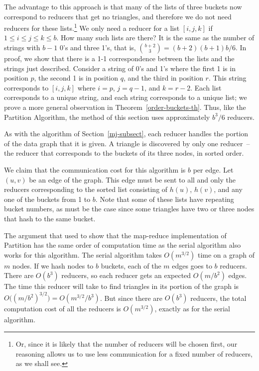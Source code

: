 The advantage to this approach is that many of the lists of three buckets now correspond to reducers that get no triangles, and therefore we do not need reducers for these lists.\footnote{Or, since it is likely that the number of reducers will be chosen first, our reasoning allows us to use less communication for a fixed number of reducers, as we shall see.}
We only need a reducer for a list $[i,j,k]$ if $1\le i \le j \le k \le b$.  How many such lists are there?  It is the same as the number of strings with $b-1$ 0's and three 1's, that is, $\binom{b+2}{3} = (b+2)(b+1)b/6$.  In proof, we show that there is a 1-1 correspondence between the lists and the strings just described.  Consider a string of 0's and 1's where the first 1 is in position $p$, the second 1 is in position $q$, and the third in position $r$.  This string corresponds to $[i,j,k]$ where $i = p$, $j = q-1$, and $k = r-2$.  Each list corresponds to a unique string, and each string corresponds to a unique list; we prove a more general observation in Theorem~\ref{order-buckets-th}.  Thus, like the Partition Algorithm, the method of this section uses approximately $b^3/6$ reducers.

As with the algorithm of Section~\ref{mj-subsect}, each reducer handles the portion of the data graph that it is given.  A triangle is discovered by only one reducer~-- the reducer that corresponds to the buckets of its three nodes, in sorted order.

We claim that the communication cost for this algorithm is $b$ per edge.
Let $(u,v)$ be an edge of the graph.  This edge must be sent to all and only the reducers corresponding to the sorted list consisting of $h(u)$, $h(v)$, and any one of the buckets from 1 to $b$.  Note that some of these lists have repeating bucket numbers, as must be the case since some triangles have two or three nodes that hash to the same bucket.

The argument that \cite{SV11} used to show that the map-reduce implementation of Partition has the same order of computation time as the serial algorithm also works for this algorithm.
The serial algorithm takes $O(m^{3/2})$ time on a graph of $m$ nodes.  If we hash nodes to $b$ buckets, each of the $m$ edges goes to $b$ reducers.  There are $O(b^3)$ reducers, so each reducer gets an expected $O(m/b^2)$ edges.  The time this reducer will take to find triangles in its portion of the graph is $O\bigl((m/b^2)^{3/2}\bigr) = O(m^{3/2}/b^3)$.  But since there are $O(b^3)$ reducers, the total computation cost of all the reducers is $O(m^{3/2})$, exactly as for the serial algorithm.


